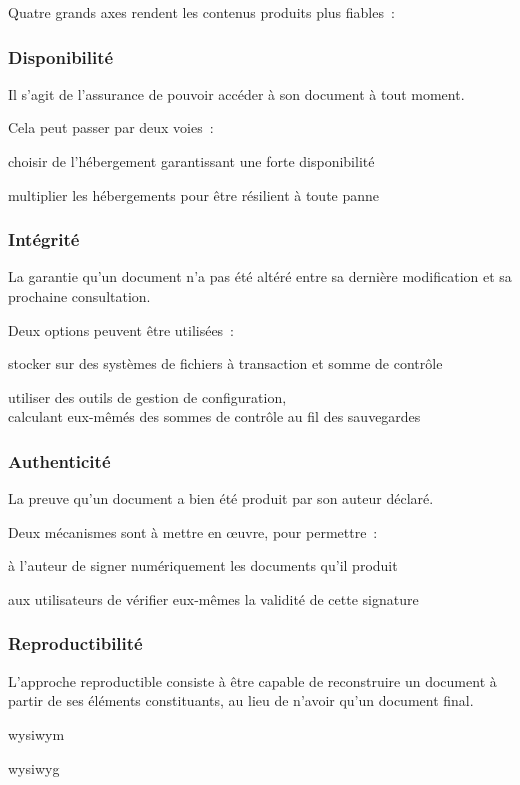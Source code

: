 Quatre grands axes rendent les contenus produits plus fiables :

\subsubsection{Disponibilité}

Il s’agit de l’assurance de pouvoir accéder à son document à tout moment.

Cela peut passer par deux voies :
\begin{itmz}
\item{choisir de l’hébergement garantissant une forte disponibilité}
\item{multiplier les hébergements pour être résilient à toute panne}
\end{itmz}

\pagebreak

\subsubsection{Intégrité}

La garantie qu’un document n’a pas été altéré
entre sa dernière modification et sa prochaine consultation.

Deux options peuvent être utilisées :
\begin{itmz}
\item{stocker sur des systèmes de fichiers à transaction et somme de contrôle}
\item{utiliser des outils de gestion de configuration,\\
calculant eux-mêmés des sommes de contrôle au fil des sauvegardes}
\end{itmz}

\subsubsection{Authenticité}

La preuve qu’un document a bien été produit par son auteur déclaré.

Deux mécanismes sont à mettre en œuvre, pour permettre :
\begin{itmz}
\item{à l’auteur de signer numériquement les documents qu’il produit}
\item{aux utilisateurs de vérifier eux-mêmes la validité de cette signature}
\end{itmz}

\subsubsection{Reproductibilité}

L’approche reproductible consiste à être capable de reconstruire un document
à partir de ses éléments constituants, au lieu de n’avoir qu’un document final.

\begin{itmz}
\item{\gls{wysiwym} \cite{wysiwym}}
\item{\gls{wysiwyg} \cite{wysiwyg}}
\end{itmz}

\pagebreak
